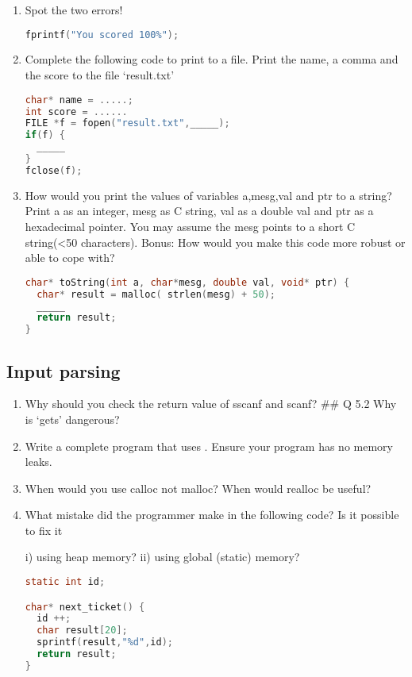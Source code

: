 \begin{enumerate}

\item Spot the two errors!

\begin{lstlisting}[language=C]
fprintf("You scored 100%");
\end{lstlisting}

\item Complete the following code to print to a file. Print the name, a comma and the score to the file `result.txt'

\begin{lstlisting}[language=C]
char* name = .....;
int score = ......
FILE *f = fopen("result.txt",_____);
if(f) {
  _____
}
fclose(f);
\end{lstlisting}

\item How would you print the values of variables a,mesg,val and ptr to a string? Print a as an integer, mesg as C string, val as a double val and ptr as a hexadecimal pointer. You may assume the mesg points to a short C string(\textless{}50 characters). Bonus: How would you make this code more robust or able to cope with?

\begin{lstlisting}[language=C]
char* toString(int a, char*mesg, double val, void* ptr) {
  char* result = malloc( strlen(mesg) + 50);
  _____
  return result;
}
\end{lstlisting}

\end{enumerate}

\subsection{Input parsing}

\begin{enumerate}
\item Why should you check the return value of sscanf and scanf? \#\# Q 5.2 Why is `gets' dangerous?

\item Write a complete program that uses . Ensure your program has no memory leaks.

\item When would you use calloc not malloc? When would realloc be useful?

\item What mistake did the programmer make in the following code? Is it possible to fix it

i) using heap memory?
ii) using global (static) memory?

\begin{lstlisting}[language=C]
static int id;

char* next_ticket() {
  id ++;
  char result[20];
  sprintf(result,"%d",id);
  return result;
}
\end{lstlisting}

\end{enumerate}

